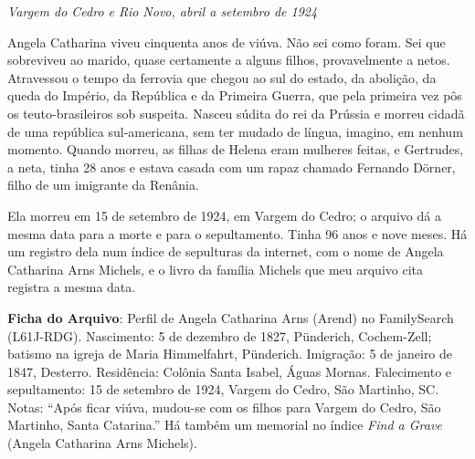 \documentclass[
  brazilian,
  11pt,
  openany]{book}
\begin{document}
\emph{Vargem do Cedro e Rio Novo, abril a setembro de 1924}

Angela Catharina viveu cinquenta anos de viúva. Não sei como foram. Sei
que sobreviveu ao marido, quase certamente a alguns filhos,
provavelmente a netos. Atravessou o tempo da ferrovia que chegou ao sul
do estado, da abolição, da queda do Império, da República e da Primeira
Guerra, que pela primeira vez pôs os teuto-brasileiros sob suspeita.
Nasceu súdita do rei da Prússia e morreu cidadã de uma república
sul-americana, sem ter mudado de língua, imagino, em nenhum momento.
Quando morreu, as filhas de Helena eram mulheres feitas, e Gertrudes, a
neta, tinha 28 anos e estava casada com um rapaz chamado Fernando
Dörner, filho de um imigrante da Renânia.

Ela morreu em 15 de setembro de 1924, em Vargem do Cedro; o arquivo dá a
mesma data para a morte e para o sepultamento. Tinha 96 anos e nove
meses. Há um registro dela num índice de sepulturas da internet, com o
nome de Angela Catharina Arns Michels, e o livro da família Michels que
meu arquivo cita registra a mesma data.

\begin{ficha}

\textbf{Ficha do Arquivo}: Perfil de Angela Catharina Arns (Arend) no
FamilySearch (L61J-RDG). Nascimento: 5 de dezembro de 1827, Pünderich,
Cochem-Zell; batismo na igreja de Maria Himmelfahrt, Pünderich.
Imigração: 5 de janeiro de 1847, Desterro. Residência: Colônia Santa
Isabel, Águas Mornas. Falecimento e sepultamento: 15 de setembro de
1924, Vargem do Cedro, São Martinho, SC. Notas: ``Após ficar viúva,
mudou-se com os filhos para Vargem do Cedro, São Martinho, Santa
Catarina.'' Há também um memorial no índice \emph{Find a Grave} (Angela
Catharina Arns Michels).

\end{ficha}
\end{document}
